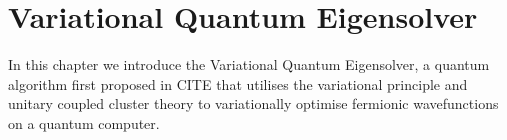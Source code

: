 \chapter{\label{variational-quantum-eigensolver}Variational Quantum Eigensolver}

In this chapter we introduce the Variational Quantum Eigensolver, a quantum algorithm first proposed in CITE that utilises the variational principle and unitary coupled cluster theory to variationally optimise fermionic wavefunctions on a quantum computer.

